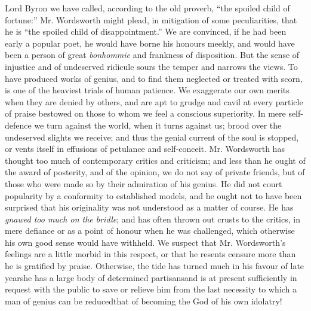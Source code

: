 Lord Byron we have called, according to the old proverb, ``the
spoiled child of fortune:'' Mr. Wordsworth might plead, in
mitigation of some peculiarities, that he is ``the spoiled child
of disappointment.'' We are convinced, if he had been early a
popular poet, he would have borne his honours meekly, and would
have been a person of great \emph{bonhommie} and frankness of
disposition. But the sense of injustice and of undeserved ridicule
sours the temper and narrows the views. To have produced works of
genius, and to find them neglected or treated with scorn, is one
of the heaviest trials of human patience. We exaggerate our own
merits when they are denied by others, and are apt to grudge and
cavil at every particle of praise bestowed on those to whom we
feel a conscious superiority. In mere self-defence we turn against
the world, when it turns against us; brood over the undeserved
slights we receive; and thus the genial current of the soul is
stopped, or vents itself in effusions of petulance and
self-conceit. Mr. Wordsworth has thought too much of contemporary
critics and criticism; and less than he ought of the award of
posterity, and of the opinion, we do not say of private friends,
but of those who were made so by their admiration of his
genius. He did not court popularity by a conformity to established
models, and he ought not to have been surprised that his
originality was not understood as a matter of course. He has
\emph{gnawed too much on the bridle}; and has often thrown out
crusts to the critics, in mere defiance or as a point of honour
when he was challenged, which otherwise his own good sense would
have withheld. We suspect that Mr. Wordsworth's feelings are a
little morbid in this respect, or that he resents censure more
than he is gratified by praise. Otherwise, the tide has turned
much in his favour of late years\textemdash he has a large body of
determined partisans\textemdash and is at present sufficiently in
request with the public to save or relieve him from the last
necessity to which a man of genius can be reduced\textemdash that
of becoming the God of his own idolatry!

